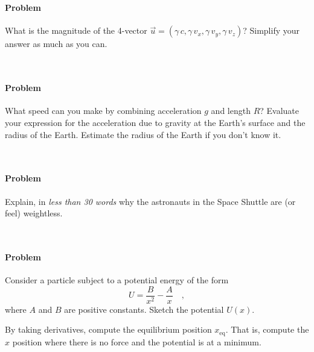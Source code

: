 \documentclass[12pt]{article}
\newcounter{problem}
\begin{document}
~ \vfill ~

\clearpage

\paragraph{Problem~\theproblem}%
What is the magnitude of the 4-vector
$\vec{u}=(\gamma\,c,\gamma\,v_x,\gamma\,v_y,\gamma\,v_z)$?  Simplify
your answer as much as you can.

~ \vfill ~

\paragraph{Problem~\theproblem}%
What speed can you make by combining acceleration $g$ and length $R$?
Evaluate your expression for the acceleration due to gravity at the
Earth's surface and the radius of the Earth.  Estimate the radius of
the Earth if you don't know it.

~ \vfill ~

\clearpage

\paragraph{Problem~\theproblem}%
Explain, in \emph{less than 30 words} why the astronauts in the Space
Shuttle are (or feel) weightless.

~ \vfill ~

\paragraph{Problem~\theproblem}%
Consider a particle subject to a potential energy of the form
\begin{equation}
U = \frac{B}{x^2} - \frac{A}{x} \quad ,
\label{eq:hard}
\end{equation}
where $A$ and $B$ are positive constants.  Sketch the potential
$U(x)$.

By taking derivatives, compute the equilibrium position
$x_\mathrm{eq}$.  That is, compute the $x$ position where there is no
force and the potential is at a minimum.

~ \vfill ~
\end{document}
